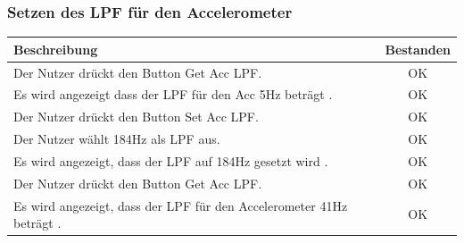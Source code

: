 \documentclass[a4paper,12pt]{article}
\newcommand{\testok}[0]{
	\cellcolor{green!25} OK
}
\begin{document}
\subsubsection{Setzen des LPF für den Accelerometer}
\begin{tabular}{ | p{12cm} | c| }
	\hline
	\textbf{Beschreibung} & \textbf{Bestanden}\\
	\hline
	Der Nutzer drückt den Button \glqq Get Acc LPF\grqq{}. & \testok \\
	\hline
	Es wird angezeigt dass der LPF für den Acc 5Hz beträgt . & \testok \\
	\hline
	Der Nutzer drückt den Button \glqq Set Acc LPF\grqq{}. & \testok \\
	\hline
	Der Nutzer wählt 184Hz als LPF aus. & \testok \\
	\hline
	Es wird angezeigt, dass der LPF auf 184Hz gesetzt wird . & \testok \\
	\hline
	Der Nutzer drückt den Button \glqq{}Get Acc LPF\grqq{}. & \testok \\
	\hline
	Es wird angezeigt, dass der LPF für den Accelerometer 41Hz beträgt . & \testok \\
	\hline
\end{tabular}
\\ \\ \\ \\
\begin{figure}[h]
	\centering
\end{figure}
\FloatBarrier
\end{document}
